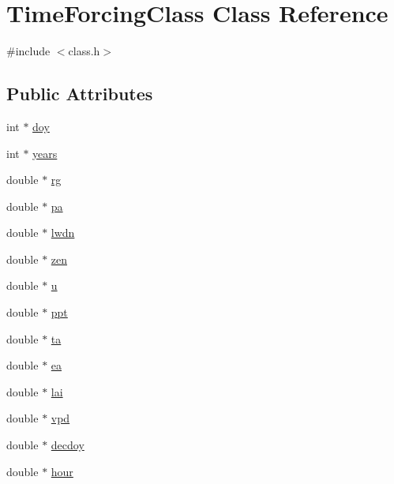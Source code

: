 \hypertarget{class_time_forcing_class}{}\section{Time\+Forcing\+Class Class Reference}
\label{class_time_forcing_class}


{\ttfamily \#include $<$class.\+h$>$}

\subsection*{Public Attributes}
\begin{DoxyCompactItemize}
\item 
int $\ast$ \hyperlink{class_time_forcing_class_a1d2ce34759c02db7ad48257eb10e8019}{doy}
\item 
int $\ast$ \hyperlink{class_time_forcing_class_a1c11295b098aa0154ef79432ad5b21d8}{years}
\item 
double $\ast$ \hyperlink{class_time_forcing_class_a0deb043dfcb1781dde3c21b75fe78e62}{rg}
\item 
double $\ast$ \hyperlink{class_time_forcing_class_a341351d44153885560055536126ee291}{pa}
\item 
double $\ast$ \hyperlink{class_time_forcing_class_a4de1a566198725d2da4fd90fa9a462ca}{lwdn}
\item 
double $\ast$ \hyperlink{class_time_forcing_class_a89d0ec073d93916e4b920be661cb4300}{zen}
\item 
double $\ast$ \hyperlink{class_time_forcing_class_a14f36478fa7ea19e9e05094c00f5ee14}{u}
\item 
double $\ast$ \hyperlink{class_time_forcing_class_a887cabe7db7123465163031b11c62546}{ppt}
\item 
double $\ast$ \hyperlink{class_time_forcing_class_a655a31784d336589df3fb3f023f696d6}{ta}
\item 
double $\ast$ \hyperlink{class_time_forcing_class_a3abf49eda83a3dfe6f4ae05bb657e6cc}{ea}
\item 
double $\ast$ \hyperlink{class_time_forcing_class_a8aec02681da6d90a4e5279b60aa44dda}{lai}
\item 
double $\ast$ \hyperlink{class_time_forcing_class_ad1c6678262217da377fa1edb50824314}{vpd}
\item 
double $\ast$ \hyperlink{class_time_forcing_class_ac4d3a787b3f4aa628e845b875bd5fbb4}{decdoy}
\item 
double $\ast$ \hyperlink{class_time_forcing_class_a5775c40a1e2c28a16ac265f50a77f970}{hour}
\end{DoxyCompactItemize}


